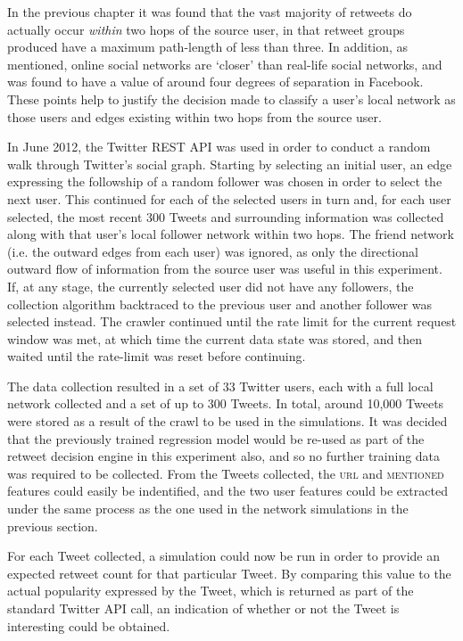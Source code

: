 In the previous chapter it was found that the vast majority of retweets do actually occur \textit{within} two hops of the source user, in that retweet groups produced have a maximum path-length of less than three. In addition, as mentioned, online social networks are `closer' than real-life social networks, and was found to have a value of around four degrees of separation in Facebook. These points help to justify the decision made to classify a user's local network as those users and edges existing within two hops from the source user.

In June 2012, the Twitter REST API was used in order to conduct a random walk through Twitter's social graph. Starting by selecting an initial user, an edge expressing the followship of a random follower was chosen in order to select the next user. This continued for each of the selected users in turn and, for each user selected, the most recent 300 Tweets and surrounding information was collected along with that user's local follower network within two hops. The friend network (i.e. the outward edges from each user) was ignored, as only the directional outward flow of information from the source user was useful in this experiment. If, at any stage, the currently selected user did not have any followers, the collection algorithm backtraced to the previous user and another follower was selected instead. The crawler continued until the rate limit for the current request window was met, at which time the current data state was stored, and then waited until the rate-limit was reset before continuing.

The data collection resulted in a set of 33 Twitter users, each with a full local network collected and a set of up to 300 Tweets. In total, around 10,000 Tweets were stored as a result of the crawl to be used in the simulations. It was decided that the previously trained regression model would be re-used as part of the retweet decision engine in this experiment also, and so no further training data was required to be collected. From the Tweets collected, the \textsc{url} and \textsc{mentioned} features could easily be indentified, and the two user features could be extracted under the same process as the one used in the network simulations in the previous section.

For each Tweet collected, a simulation could now be run in order to provide an expected retweet count for that particular Tweet. By comparing this value to the actual popularity expressed by the Tweet, which is returned as part of the standard Twitter API call, an indication of whether or not the Tweet is interesting could be obtained.



